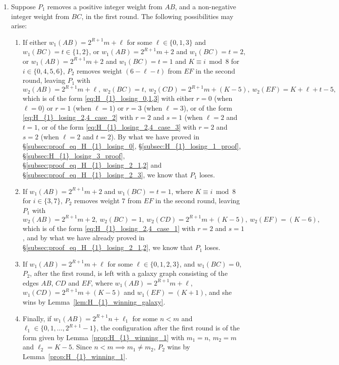 \documentclass[11pt,reqno]{amsart}
\theoremstyle{definition}
\theoremstyle{definition}
\begin{document}
\begin{enumerate}
\item Suppose $P_{1}$ removes a positive integer weight from $AB$, and a non-negative integer weight from $BC$, in the first round. The following possibilities may arise:
\begin{enumerate}
\item If either $w_{1}(AB)=2^{R+1}m+\ell$ for some $\ell \in \{0,1,3\}$ and $w_{1}(BC)=t\in\{1,2\}$, or $w_{1}(AB)=2^{R+1}m+2$ and $w_{1}(BC)=t=2$, or $w_{1}(AB)=2^{R+1}m+2$ and $w_{1}(BC)=t=1$ and $K \equiv i \bmod 8$ for $i \in \{0,4,5,6\}$, $P_{2}$ removes weight $(6-\ell-t)$ from $EF$ in the second round, leaving $P_{1}$ with
\begin{equation}
w_{2}(AB)=2^{R+1}m+\ell,\ w_{2}(BC)=t,\ w_{2}(CD)=2^{R+1}m+(K-5),\ w_{2}(EF)=K+\ell+t-5,\nonumber
\end{equation}
which is of the form \eqref{eq:H_{1}_losing_0,1,3} with either $r=0$ (when $\ell=0$) or $r=1$ (when $\ell=1$) or $r=3$ (when $\ell=3$), or of the form \eqref{eq:H_{1}_losing_2,4_case_2} with $r=2$ and $s=1$ (when $\ell=2$ and $t=1$, or of the form \eqref{eq:H_{1}_losing_2,4_case_3} with $r=2$ and $s=2$ (when $\ell=2$ and $t=2$). By what we have proved in \S\ref{subsec:proof_eq_H_{1}_losing_0}, \S\ref{subsec:H_{1}_losing_1_proof}, \S\ref{subsec:H_{1}_losing_3_proof}, \S\ref{subsec:proof_eq_H_{1}_losing_2_1,2} and \S\ref{subsec:proof_eq_H_{1}_losing_2_3}, we know that $P_{1}$ loses.

\item If $w_{1}(AB)=2^{R+1}m+2$ and $w_{1}(BC)=t=1$, where $K \equiv i \bmod 8$ for $i \in \{3,7\}$, $P_{2}$ removes weight $7$ from $EF$ in the second round, leaving $P_{1}$ with 
\begin{equation}
w_{2}(AB)=2^{R+1}m+2,\ w_{2}(BC)=1,\ w_{2}(CD)=2^{R+1}m+(K-5),\ w_{2}(EF)=(K-6),\nonumber
\end{equation}
which is of the form \eqref{eq:H_{1}_losing_2,4_case_1} with $r=2$ and $s=1$, and by what we have already proved in \S\ref{subsec:proof_eq_H_{1}_losing_2_1,2}, we know that $P_{1}$ loses.

\item If $w_{1}(AB)=2^{R+1}m+\ell$ for some $\ell \in \{0,1,2,3\}$, and $w_{1}(BC)=0$, $P_{2}$, after the first round, is left with a galaxy graph consisting of the edges $AB$, $CD$ and $EF$, where $w_{1}(AB)=2^{R+1}m+\ell$, $w_{1}(CD)=2^{R+1}m+(K-5)$ and $w_{1}(EF)=(K+1)$, and she wins by Lemma~\ref{lem:H_{1}_winning_galaxy}.

\item Finally, if $w_{1}(AB)=2^{R+1}n+\ell_{1}$ for some $n<m$ and $\ell_{1}\in\{0,1,\ldots,2^{R+1}-1\}$, the configuration after the first round is of the form given by Lemma~\ref{prop:H_{1}_winning_1} with $m_{1}=n$, $m_{2}=m$ and $\ell_{2}=K-5$. Since $n<m \implies m_{1}\neq m_{2}$, $P_{2}$ wins by Lemma~\ref{prop:H_{1}_winning_1}.
\end{enumerate}


\end{enumerate}
\end{document}

